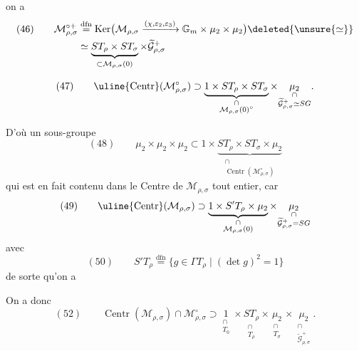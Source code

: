 \par{}


on a
\[
\begin{aligned}
(46)\qquad
\mathcal M_{\rho,\sigma}^{\circ+}
&\overset{\mathrm{dfn}}{=}
\operatorname{Ker}\bigl(\mathcal M_{\rho,\sigma}
\xrightarrow{(\chi,\varepsilon_2,\varepsilon_3)}
\mathbb G_m\times\mu_2\times\mu_2\bigr)
\deleted{\unsure{\simeq}}\\
&\simeq
\underbrace{ST_\rho\times ST_\sigma}_{\subset\mathcal M_{\rho,\sigma}(0)}
\times\widetilde{\mathcal G}_{\rho,\sigma}^{+}
\end{aligned}
\]



\[
(47)\qquad
\uline{\operatorname{Centr}}(\mathcal M_{\rho,\sigma}^{\circ})
\supset
\underbrace{1\times ST_\rho\times ST_\sigma}_{\substack{\cap\\
\mathcal M_{\rho,\sigma}(0)^\circ}}
\times
\underset{\substack{\cap\\\widetilde{\mathcal G}_{\rho,\sigma}^{+}\simeq SG}}{\mu_2}.
\]

D'où un sous-groupe
\[
(48)\qquad
\mu_2\times\mu_2\times\mu_2
\subset 1\times
\underbrace{ST_\rho\times ST_\sigma\times\mu_2}_{\substack{\cap\\
\operatorname{Centr}(\mathcal M_{\rho,\sigma}^{\circ})}}
\]
qui est en fait contenu dans le Centre de $\mathcal M_{\rho,\sigma}$
tout entier, car
\[
(49)\qquad
\uline{\operatorname{Centr}}(\mathcal M_{\rho,\sigma})
\supset
\underbrace{1\times S'T_\rho\times\mu_2}_{\substack{\cap\\
\mathcal M_{\rho,\sigma}(0)}}
\times
\underset{\substack{\cap\\\widetilde{\mathcal G}_{\rho,\sigma}^{+}=SG}}{\mu_2}
\]
avec
\[
(50)\qquad
S'T_\rho\overset{\mathrm{dfn}}{=}
\{g\in\Gamma T_\rho\mid(\det g)^2=1\}
\]
de sorte qu'on a

On a donc
\[
(52)\qquad
\operatorname{Centr}(\mathcal M_{\rho,\sigma})\cap
\mathcal M_{\rho,\sigma}^{\circ}
\supset
\underset{\substack{\cap\\T_0}}{1}\times
\underset{\substack{\cap\\T_\rho}}{ST_\rho}\times
\underset{\substack{\cap\\T_\sigma}}{\mu_2}\times
\underset{\substack{\cap\\\widetilde{\mathcal G}_{\rho,\sigma}^{+}}}{\mu_2}.
\]

